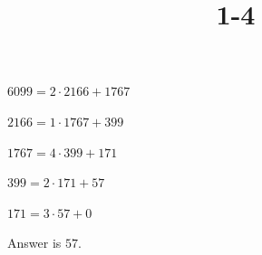 \documentclass{article}
\title{1-4}
\begin{document}
\maketitle

\( 6099 = 2 \cdot 2166 + 1767 \)

\( 2166 = 1 \cdot 1767 + 399 \)

\( 1767 = 4 \cdot 399 + 171 \)

\( 399 = 2 \cdot 171 + 57 \)

\( 171 = 3 \cdot 57 + 0 \)

Answer is \( 57 \).
\end{document}
